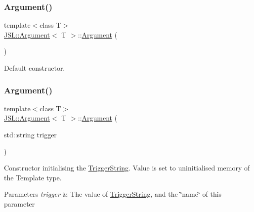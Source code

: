 \subsubsection{\texorpdfstring{Argument()}{Argument()}\hspace{0.1cm}{\footnotesize\ttfamily [1/5]}}
{\footnotesize\ttfamily template$<$class T$>$ \\
\hyperlink{classJSL_1_1Argument}{J\+S\+L\+::\+Argument}$<$ T $>$\+::\hyperlink{classJSL_1_1Argument}{Argument} (\begin{DoxyParamCaption}{ }\end{DoxyParamCaption})\hspace{0.3cm}{\ttfamily [inline]}}



Default constructor. 

\mbox{\label{classJSL_1_1Argument_ab07e7981db832cce30f534c67f6491f4}} 
\subsubsection{\texorpdfstring{Argument()}{Argument()}\hspace{0.1cm}{\footnotesize\ttfamily [2/5]}}
{\footnotesize\ttfamily template$<$class T$>$ \\
\hyperlink{classJSL_1_1Argument}{J\+S\+L\+::\+Argument}$<$ T $>$\+::\hyperlink{classJSL_1_1Argument}{Argument} (\begin{DoxyParamCaption}\item[{std\+::string}]{trigger }\end{DoxyParamCaption})\hspace{0.3cm}{\ttfamily [inline]}}



Constructor initialising the \hyperlink{classJSL_1_1ArgumentInterface_afa2d1f96c4971070d3de5824f297312f}{Trigger\+String}. Value is set to uninitialised memory of the Template type. 


\begin{DoxyParams}{Parameters}
{\em trigger} & The value of \hyperlink{classJSL_1_1ArgumentInterface_afa2d1f96c4971070d3de5824f297312f}{Trigger\+String}, and the \char`\"{}name\char`\"{} of this parameter \\
\hline
\end{DoxyParams}
\mbox{\label{classJSL_1_1Argument_a2511f7c98ee2b0b59650f468341b8747}} 

